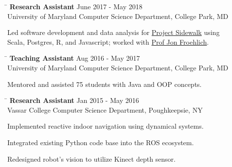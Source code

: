 \documentclass{res}
\begin{document}
\begin{resume}
{    \vspace{-12pt}
    \begin{tabbing}
      \hspace{5.65in}\=  \kill %
      {\bf Research Assistant}
      \>June 2017 - May 2018\\
      University of Maryland Computer Science Department, College Park, MD\\     
    \end{tabbing}
    \vspace{-24pt}      %
    \begin{list}{\bf{-}}{}
      \setlength{\itemsep}{-2pt}
      \item Led software development and data analysis for
            \href{http://sidewalk.umiacs.umd.edu/}{Project Sidewalk} using\\
            Scala, Postgres, R, and Javascript; worked with
            \href{http://www.cs.umd.edu/~jonf/}{Prof Jon Froehlich}.
    \end{list}

    \vspace{-12pt}
    \begin{tabbing}
      \hspace{5.65in}\=  \kill %
      {\bf Teaching Assistant}
      \>Aug 2016 - May 2017\\
      University of Maryland Computer Science Department, College Park, MD\\     
    \end{tabbing}
    \vspace{-24pt}      %
    \begin{list}{\bf{-}}{}
      \setlength{\itemsep}{-2pt}
      \item Mentored and assisted 75 students with Java and OOP concepts.
    \end{list}
    
    \vspace{-12pt}
    \begin{tabbing}
      \hspace{5.65in}\=  \kill %
      {\bf Research Assistant}
      \>Jan 2015 - May 2016\\
      Vassar College Computer Science Department, Poughkeepsie, NY\\     
    \end{tabbing}
    \vspace{-24pt}      %
    \begin{list}{\bf{-}}{}
      \setlength{\itemsep}{-2pt}
      \item Implemented reactive indoor navigation using dynamical systems.
      \item Integrated existing Python code base into the ROS ecosystem.
      \item Redesigned robot's vision to utilize Kinect depth sensor.
    \end{list}

}
\end{resume}
\end{document}
